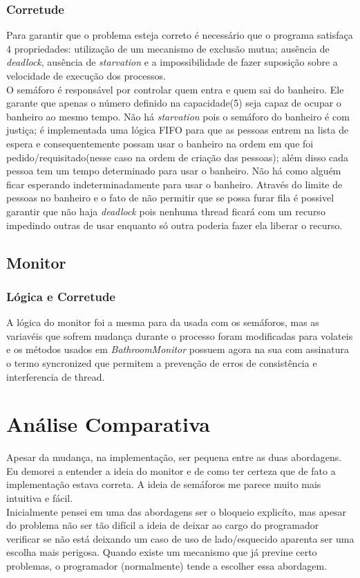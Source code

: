 \documentclass{article}
\newcommand\tab[1][1cm]{\hspace*{#1}}
\begin{document}
\subsubsection*{Corretude}
\tab Para garantir que o problema esteja correto é necessário que o programa satisfaça 4 propriedades: utilização de um mecanismo de exclusão mutua; ausência de \textit{deadlock}, ausência de \textit{starvation} e a impossibilidade de fazer suposição sobre a velocidade de execução dos processos.\\
\tab O semáforo é responsável por controlar quem entra e quem sai do banheiro. Ele garante que apenas o número definido na capacidade(5) seja capaz de ocupar o banheiro ao mesmo tempo.\hfill \break
\tab Não há \textit{starvation} pois o semáforo do banheiro é com justiça; é implementada uma lógica FIFO para que as pessoas entrem na lista de espera e consequentemente possam usar o banheiro na ordem em que foi pedido/requisitado(nesse caso na ordem de criação das pessoas); além disso cada pessoa tem um tempo determinado para usar o banheiro. Não há como alguém ficar esperando indeterminadamente para usar o banheiro.\hfill \break
\tab Através do limite de pessoas no banheiro e o fato de não permitir que se possa furar fila é possivel garantir que não haja \textit{deadlock} pois nenhuma thread ficará com um recurso impedindo outras de usar enquanto só outra poderia fazer ela liberar o recurso.

\subsection*{Monitor}
\subsubsection*{Lógica e Corretude}
\tab  A lógica do monitor foi a mesma para da usada com os semáforos, mas as variavéis que sofrem mudança durante o processo foram modificadas para volateis e os métodos usados em \textit{BathroomMonitor} possuem agora na sua com assinatura o termo syncronized que permitem a prevenção de erros de consistência e  interferencia de thread. 

\section*{Análise Comparativa}
\tab Apesar da mudança, na implementação, ser pequena entre as duas abordagens. Eu demorei a entender a ideia do monitor e de como ter certeza que de fato a implementação estava correta. A ideia de semáforos me parece muito mais intuitiva e fácil. \\
Inicialmente pensei em uma das abordagens ser o bloqueio explicíto, mas apesar do problema não ser tão difícil a ideia de deixar ao cargo do programador verificar se não está deixando um caso de uso de lado/esquecido aparenta ser uma escolha mais perigosa. Quando existe um mecanismo que já previne certo problemas, o programador (normalmente) tende a escolher essa abordagem.
\end{document}
